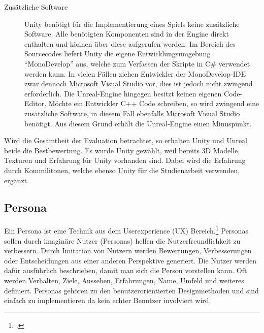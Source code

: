 \begin{description}
		\item[Zusätzliche Software]{Unity benötigt für die Implementierung eines Spiels keine zusätzliche Software. Alle benötigten Komponenten sind in der Engine direkt enthalten und können über diese aufgerufen werden. Im Bereich des Sourcecodes liefert Unity die eigene Entwicklungsumgebung \enquote{MonoDevelop} aus, welche zum Verfassen der Skripte in C\# verwendet werden kann. In vielen Fällen ziehen Entwickler der MonoDevelop-IDE zwar dennoch Microsoft Visual Studio vor, dies ist jedoch nicht zwingend erforderlich. Die Unreal-Engine hingegen besitzt keinen eigenen Code-Editor. Möchte ein Entwickler C++ Code schreiben, so wird zwingend eine zusätzliche Software, in diesem Fall ebenfalls Microsoft Visual Studio benötigt. Aus diesem Grund erhält die Unreal-Engine einen Minuspunkt.}
	\end{description}
	Wird die Gesamtheit der Evaluation betrachtet, so erhalten Unity und Unreal beide die Bestbewertung. Es wurde Unity gewählt, weil bereits 3D Modelle, Texturen und Erfahrung für Unity vorhanden sind. Dabei wird die Erfahrung durch Kommilitonen, welche ebenso Unity für die Studienarbeit verwenden, ergänzt.

\subsection{Persona}\label{ssec:persona}
	Ein Persona ist eine Technik aus dem Userexperience (UX) Bereich.\footcite{persona} Personas sollen durch imaginäre Nutzer (Personas) helfen die Nutzerfreundlichkeit zu verbessern. Durch Imitation von Nutzern werden Bewertungen, Verbesserungen oder Entscheidungen aus einer anderen Perspektive generiert. Die Nutzer werden dafür ausführlich beschrieben, damit man sich die Person vorstellen kann. Oft werden Verhalten, Ziele, Aussehen, Erfahrungen, Name, Umfeld und weiteres definiert.
	Personas gehören zu den benutzerorientierten Designmethoden und sind einfach zu implementieren da kein echter Benutzer involviert wird.
